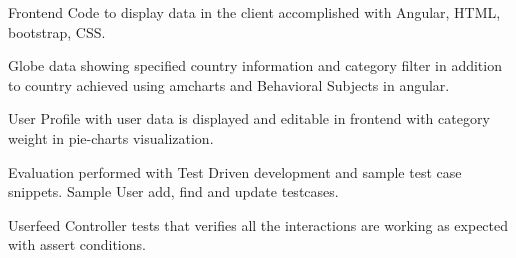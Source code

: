 \begin{appendices}
Frontend Code to display data in the client accomplished with Angular, HTML, bootstrap, CSS.

Globe data showing specified country information and category filter in addition to country achieved using amcharts and Behavioral Subjects in angular.
 

User Profile with user data is displayed and editable in frontend with category weight in pie-charts visualization.
 

Evaluation performed with Test Driven development and sample test case snippets.
Sample User add, find and update testcases.
 

Userfeed Controller tests that verifies all the interactions are working as expected with assert conditions.

 
\end{appendices}